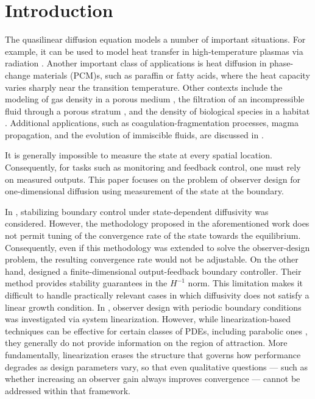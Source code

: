 \documentclass[twocolumn]{autart}
\begin{document}
\setlength{\abovedisplayskip}{4pt}
\setlength{\belowdisplayskip}{4pt}
\setlength{\abovedisplayshortskip}{2pt}
\setlength{\belowdisplayshortskip}{2pt}

\section{Introduction} \label{Introduction}

The quasilinear diffusion equation models a number of important situations. For example, it can be used to model heat transfer in high-temperature plasmas via radiation \cite[Pages 652--684]{plasma}. Another important class of applications is  heat diffusion in phase-change materials (PCM)s, such as paraffin or fatty acids, where the heat capacity varies sharply near the transition temperature. Other contexts include the modeling of gas density in a porous medium \cite{porous1}, the filtration of an incompressible fluid through a porous stratum \cite{boussinesq}, and the density of biological species in a habitat \cite[Section 2.4]{vazquez}. 
Additional applications, such as coagulation-fragmentation processes, magma propagation, and the evolution of immiscible fluids, are discussed in \cite[Chapter 21]{vazquez}.

It is generally impossible to measure the state at every spatial location. Consequently, for tasks such as monitoring and feedback control, one must rely on measured outputs. This paper focuses on the problem of observer design for  one-dimensional diffusion using measurement of the state at the boundary.

In \cite{camil_finite_2}, stabilizing boundary control under state-dependent diffusivity was considered. However, the methodology proposed in the aforementioned work does not permit tuning of the convergence rate of the state towards the equilibrium. Consequently, even if this methodology was extended to solve the observer-design problem, the resulting convergence rate would not be adjustable. On the other hand, \cite{hugo} designed a finite-dimensional output-feedback boundary controller. Their method  provides stability guarantees in the $H^{-1}$ norm. This limitation makes it difficult to handle practically relevant cases in which diffusivity does not satisfy a linear growth condition. In \cite{quasi_1}, observer design with periodic boundary conditions was investigated via system linearization. However, while linearization-based techniques can be effective for certain classes of PDEs, including parabolic ones \cite{kirsten3}, they generally do not provide information on the region of attraction. More fundamentally, linearization erases the structure that governs how performance degrades as design parameters vary, so that even qualitative questions --- such as whether increasing an observer gain always improves convergence --- cannot be addressed within that framework. 
\end{document}
